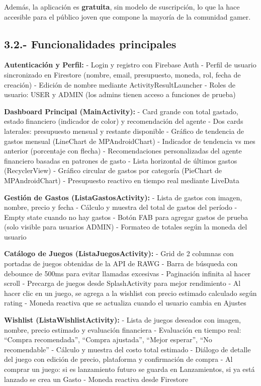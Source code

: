 \documentclass[
  spanish,
  11pt,
  paper=a4,
  ,captions=tableheading
]{scrartcl}
\begin{document}
Además, la aplicación es \textbf{gratuita}, sin modelo de suscripción,
lo que la hace accesible para el público joven que compone la mayoría de
la comunidad gamer.

\newpage

\hypertarget{funcionalidades-principales}{%
\subsection{3.2.- Funcionalidades
principales}\label{funcionalidades-principales}}

\textbf{Autenticación y Perfil:} - Login y registro con Firebase Auth -
Perfil de usuario sincronizado en Firestore (nombre, email, presupuesto,
moneda, rol, fecha de creación) - Edición de nombre mediante
ActivityResultLauncher - Roles de usuario: USER y ADMIN (los admins
tienen acceso a funciones de prueba)

\textbf{Dashboard Principal (MainActivity):} - Card grande con total
gastado, estado financiero (indicador de color) y recomendación del
agente - Dos cards laterales: presupuesto mensual y restante disponible
- Gráfico de tendencia de gastos mensual (LineChart de MPAndroidChart) -
Indicador de tendencia vs mes anterior (porcentaje con flecha) -
Recomendaciones personalizadas del agente financiero basadas en patrones
de gasto - Lista horizontal de últimos gastos (RecyclerView) - Gráfico
circular de gastos por categoría (PieChart de MPAndroidChart) -
Presupuesto reactivo en tiempo real mediante LiveData

\textbf{Gestión de Gastos (ListaGastosActivity):} - Lista de gastos con
imagen, nombre, precio y fecha - Cálculo y muestra del total de gastos
del período - Empty state cuando no hay gastos - Botón FAB para agregar
gastos de prueba (solo visible para usuarios ADMIN) - Formateo de
totales según la moneda del usuario

\textbf{Catálogo de Juegos (ListaJuegosActivity):} - Grid de 2 columnas
con portadas de juegos obtenidas de la API de RAWG - Barra de búsqueda
con debounce de 500ms para evitar llamadas excesivas - Paginación
infinita al hacer scroll - Precarga de juegos desde SplashActivity para
mejor rendimiento - Al hacer clic en un juego, se agrega a la wishlist
con precio estimado calculado según rating - Moneda reactiva que se
actualiza cuando el usuario cambia en Ajustes

\textbf{Wishlist (ListaWishlistActivity):} - Lista de juegos deseados
con imagen, nombre, precio estimado y evaluación financiera - Evaluación
en tiempo real: ``Compra recomendada'', ``Compra ajustada'', ``Mejor
esperar'', ``No recomendable'' - Cálculo y muestra del costo total
estimado - Diálogo de detalle del juego con edición de precio,
plataforma y confirmación de compra - Al comprar un juego: si es
lanzamiento futuro se guarda en Lanzamientos, si ya está lanzado se crea
un Gasto - Moneda reactiva desde Firestore
\end{document}
